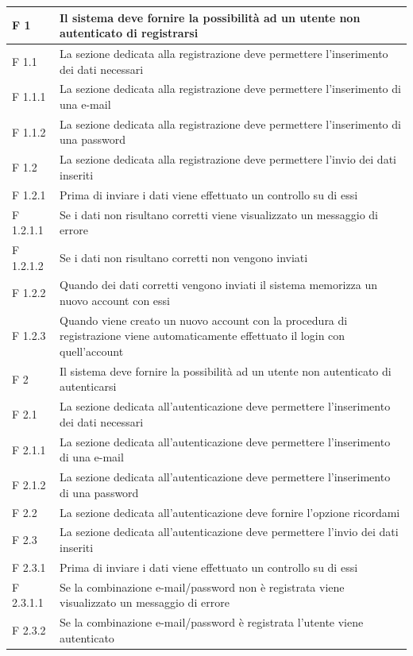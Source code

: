 \documentclass[a4paper,11pt]{article}
\begin{document}
\begin{longtable}{p{}p{}}
F 1 & Il sistema deve fornire la possibilità ad un utente non autenticato di registrarsi\\
\midrule
F 1.1 & La sezione dedicata alla registrazione deve permettere l'inserimento dei dati necessari\\
\midrule
F 1.1.1 & La sezione dedicata alla registrazione deve permettere l'inserimento di una e-mail\\
\midrule
F 1.1.2 & La sezione dedicata alla registrazione deve permettere l'inserimento di una password\\
\midrule
F 1.2 & La sezione dedicata alla registrazione deve permettere l'invio dei dati inseriti\\
\midrule
F 1.2.1 & Prima di inviare i dati viene effettuato un controllo su di essi\\
\midrule
F 1.2.1.1 & Se i dati non risultano corretti viene visualizzato un messaggio di errore\\
\midrule
F 1.2.1.2 & Se i dati non risultano corretti non vengono inviati\\
\midrule
F 1.2.2 & Quando dei dati corretti vengono inviati il sistema memorizza un nuovo account con essi\\
\midrule
F 1.2.3 & Quando viene creato un nuovo account con la procedura di registrazione viene automaticamente effettuato il login con quell'account\\
\midrule
F 2 & Il sistema deve fornire la possibilità ad un utente non autenticato di autenticarsi\\
\midrule
F 2.1 & La sezione dedicata all'autenticazione deve permettere l'inserimento dei dati necessari\\
\midrule
F 2.1.1 & La sezione dedicata all'autenticazione deve permettere l'inserimento di una e-mail\\
\midrule
F 2.1.2 & La sezione dedicata all'autenticazione deve permettere l'inserimento di una password\\
\midrule
F 2.2 & La sezione dedicata all'autenticazione deve fornire l'opzione ricordami\\
\midrule
F 2.3 & La sezione dedicata all'autenticazione deve permettere l'invio dei dati inseriti\\
\midrule
F 2.3.1 & Prima di inviare i dati viene effettuato un controllo su di essi\\
\midrule
F 2.3.1.1 & Se la combinazione e-mail/password non è registrata viene visualizzato un messaggio di errore\\
\midrule
F 2.3.2 & Se la combinazione e-mail/password è registrata l'utente viene autenticato\\

\end{longtable}
\end{document}
